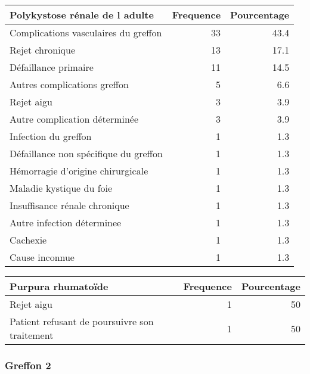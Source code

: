 \documentclass[11pt,a4paper]{article}\usepackage[]{graphicx}\usepackage[]{color}
\begin{document}
\begin{table}[H]
\centering
\begin{tabular}{lrr}
  \hline
Polykystose rénale de l adulte & Frequence & Pourcentage \\ 
  \hline
Complications vasculaires du greffon & 33 & 43.4 \\ 
  Rejet chronique & 13 & 17.1 \\ 
  Défaillance primaire & 11 & 14.5 \\ 
  Autres complications greffon & 5 & 6.6 \\ 
  Rejet aigu & 3 & 3.9 \\ 
  Autre complication déterminée & 3 & 3.9 \\ 
  Infection du greffon & 1 & 1.3 \\ 
  Défaillance non spécifique du greffon & 1 & 1.3 \\ 
  Hémorragie d'origine chirurgicale & 1 & 1.3 \\ 
  Maladie kystique du foie & 1 & 1.3 \\ 
  Insuffisance rénale chronique & 1 & 1.3 \\ 
  Autre infection déterminee & 1 & 1.3 \\ 
  Cachexie & 1 & 1.3 \\ 
  Cause inconnue & 1 & 1.3 \\ 
   \hline
\end{tabular}
\end{table}
\begin{table}[H]
\centering
\begin{tabular}{lrr}
  \hline
Purpura rhumatoïde & Frequence & Pourcentage \\ 
  \hline
Rejet aigu & 1 & 50 \\ 
  Patient refusant de poursuivre son traitement & 1 & 50 \\ 
   \hline
\end{tabular}
\end{table}


\subsubsection*{Greffon 2}
\end{document}
